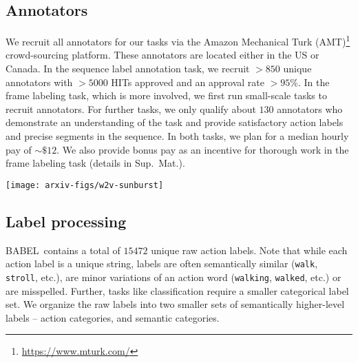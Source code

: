 \documentclass[final]{cvpr}
\def\babel{BABEL}
\begin{document}
\subsection{Annotators} 
We recruit all annotators for our tasks via the Amazon Mechanical Turk (AMT)\footnote{\url{https://www.mturk.com/}}
crowd-sourcing platform. 
These annotators are located either in the US or Canada. 
In the sequence label annotation task, we recruit $> 850$ unique annotators with $>5000$ HITs approved and an approval rate $> 95\%$. 
In the frame labeling task, which is more involved, we first run small-scale tasks to recruit annotators. For further tasks, we only qualify about $130$ annotators who demonstrate an understanding of the task and  provide satisfactory action labels and precise segments in the sequence. 
In both tasks, we plan for a median hourly pay of $\sim \$12$. 
We also provide bonus pay as an incentive for thorough work in the frame labeling task (details in Sup.~Mat.). 

\begin{figure*}[t!]
    \centering
    \texttt{[image: arxiv-figs/w2v-sunburst]}    
    \caption{
    \emph{Left.} 2D t-SNE \cite{maaten2008visualizing} visualization of the semantic space that we project raw labels into. Similar labels are grouped via K-means clustering. 
    The green shading and points represent the `dance' cluster and its members respectively. 
    \emph{Center.} Distribution of (a subset of) action categories (outer circle) under each semantic category (inner circle) in \babel. 
    The angle occupied by the action category is proportional to the number of unique raw label strings associated with it. 
    Action categories with a large number of fine-grained descriptions are shown. 
    \emph{Right.} Subset of the fine-grained descriptions associated with selected action categories. 
    }
    \label{fig:sunburst}
\end{figure*}

\subsection{Label processing}
\label{subsec:label_processing}
 
\babel~contains a total of $15472$ unique raw action labels. 
Note that while each action label is a unique string, labels are often semantically similar (\texttt{walk}, \texttt{stroll}, etc.), are minor variations of an action word (\texttt{walking}, \texttt{walked}, etc.) or are misspelled. 
Further, tasks like classification require a smaller categorical label set. 
We organize the raw labels into two smaller sets of semantically higher-level labels -- action categories, and semantic categories. 
\end{document}
